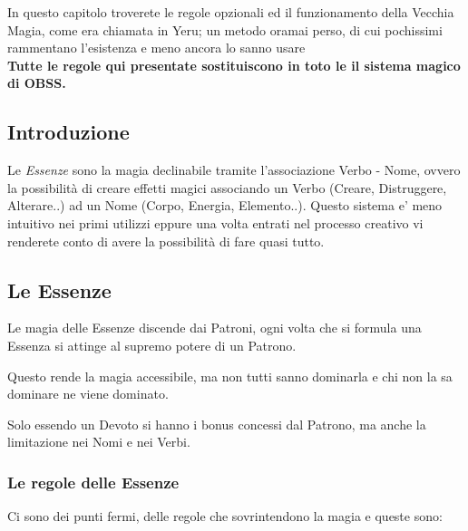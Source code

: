 \documentclass[a4paper,twoside,openany]{book}
\begin{document}
\begin{multicols}{2}

\begin{changemargin}{0.3cm}{0.3cm}\begin{narratore}

In questo capitolo troverete le regole opzionali ed il funzionamento della Vecchia Magia, come era chiamata in Yeru; un metodo oramai perso, di cui pochissimi rammentano l'esistenza e meno ancora lo sanno usare\\

\textbf{Tutte le regole qui presentate sostituiscono in toto le il sistema magico di OBSS.}

\end{narratore}\end{changemargin}

\subsection{Introduzione}

Le \textit{Essenze} sono la magia declinabile tramite l'associazione Verbo - Nome, ovvero la possibilità di creare effetti magici associando un Verbo (Creare, Distruggere, Alterare..) ad un Nome (Corpo, Energia, Elemento..). Questo sistema e' meno intuitivo nei primi utilizzi eppure una volta entrati nel processo creativo vi renderete conto di avere la possibilità di fare quasi tutto.

\subsection{Le Essenze}

Le magia delle Essenze discende dai Patroni, ogni volta che si formula una Essenza si attinge al supremo potere di un Patrono.

Questo rende la magia accessibile, ma non tutti sanno dominarla e chi non la sa dominare ne viene dominato.

Solo essendo un Devoto si hanno i bonus concessi dal Patrono, ma anche la limitazione nei Nomi e nei Verbi. 

\subsubsection{Le regole delle Essenze}

\label{le-regole-delle-essenze}

Ci sono dei punti fermi, delle regole che sovrintendono la magia e queste sono:


\end{multicols}
\end{document}
